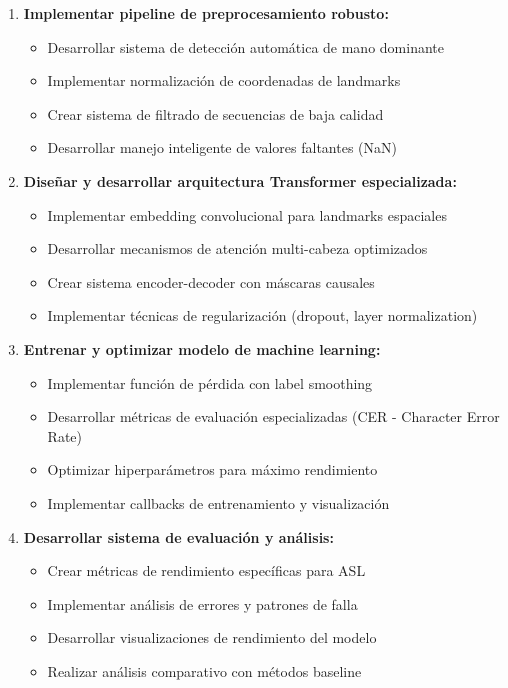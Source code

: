 \documentclass[12pt,a4paper]{article}
\begin{document}
\begin{enumerate}
    \item \textbf{Implementar pipeline de preprocesamiento robusto:}
    \begin{itemize}
        \item Desarrollar sistema de detección automática de mano dominante
        \item Implementar normalización de coordenadas de landmarks
        \item Crear sistema de filtrado de secuencias de baja calidad
        \item Desarrollar manejo inteligente de valores faltantes (NaN)
    \end{itemize}
    
    \item \textbf{Diseñar y desarrollar arquitectura Transformer especializada:}
    \begin{itemize}
        \item Implementar embedding convolucional para landmarks espaciales
        \item Desarrollar mecanismos de atención multi-cabeza optimizados
        \item Crear sistema encoder-decoder con máscaras causales
        \item Implementar técnicas de regularización (dropout, layer normalization)
    \end{itemize}
    
    \item \textbf{Entrenar y optimizar modelo de machine learning:}
    \begin{itemize}
        \item Implementar función de pérdida con label smoothing
        \item Desarrollar métricas de evaluación especializadas (CER - Character Error Rate)
        \item Optimizar hiperparámetros para máximo rendimiento
        \item Implementar callbacks de entrenamiento y visualización
    \end{itemize}
    
    \item \textbf{Desarrollar sistema de evaluación y análisis:}
    \begin{itemize}
        \item Crear métricas de rendimiento específicas para ASL
        \item Implementar análisis de errores y patrones de falla
        \item Desarrollar visualizaciones de rendimiento del modelo
        \item Realizar análisis comparativo con métodos baseline
    \end{itemize}
    

\end{enumerate}
\end{document}
